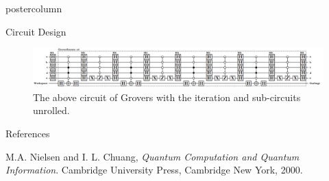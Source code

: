 \documentclass[final]{beamer} %
\begin{document}
\begin{frame}{}
\begin{columns}
\begin{column}{.33\textwidth}
\begin{beamercolorbox}[center,wd=\textwidth]{postercolumn}
\begin{minipage}[c][0.95\textheight][s]{0.95\columnwidth}
\begin{block}{\large Circuit Design}
\begin{figure}[!htbp]
		            \centering
		            \includegraphics[width=14in]{figures/Grover_Unroll.png}
		            \caption{The above circuit of Grovers with the iteration and sub-circuits unrolled.}
		        \end{figure}
            \end{block}
            \vfill
            \begin{block}{\large References}
		    \begin{thebibliography}{9}
                \small{
  		            M.A. Nielsen and I. L. Chuang, 
  		            \emph{Quantum Computation and Quantum Information}.
  		            Cambridge University Press,
		            Cambridge New York,
  		            2000.
                }
		    \end{thebibliography}
            \end{block}
            \vfill
        \end{minipage}
        \end{beamercolorbox}
        \end{column}


\end{columns}
\end{frame}
\end{document}
